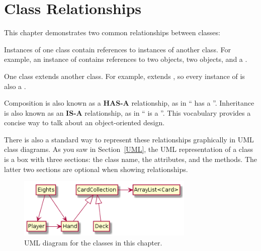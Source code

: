 \section{Class Relationships}


This chapter demonstrates two common relationships between classes:

\begin{description}

Instances of one class contain references to instances of another class.
For example, an instance of  contains references to two  objects, two  objects, and a .

One class extends another class.
For example,  extends , so every instance of  is also a .

\end{description}


Composition is also known as a {\bf HAS-A} relationship, as in `` has a ''.
Inheritance is also known as an {\bf IS-A} relationship, as in `` is a ''.
This vocabulary provides a concise way to talk about an object-oriented design.


There is also a standard way to represent these relationships graphically in UML class diagrams.
As you saw in Section~\ref{UML}, the UML representation of a class is a box with three sections: the class name, the attributes, and the methods.
The latter two sections are optional when showing relationships.


\begin{figure}[!ht]
\begin{center}
\includegraphics[width=0.75\textwidth]{figs/uml1.png}
\caption{UML diagram for the classes in this chapter.}
\label{fig.uml1}
\end{center}
\end{figure}

